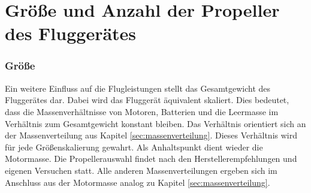 \section{Größe und Anzahl der Propeller des Fluggerätes}
\label{sec:groesse}
\subsubsection{Größe}
\label{subsubsec:groesse}
Ein weitere Einfluss auf die Flugleistungen stellt das Gesamtgewicht des Fluggerätes dar. Dabei wird das Fluggerät äquivalent skaliert. Dies bedeutet, dass die Massenverhältnisse von Motoren, Batterien und die Leermasse im Verhältnis zum Gesamtgewicht konstant bleiben. Das Verhältnis orientiert sich an der Massenverteilung aus Kapitel \ref{sec:massenverteilung}. Dieses Verhältnis wird für jede Größenskalierung gewahrt. Als Anhaltspunkt dient wieder die Motormasse. Die Propellerauswahl findet nach den Herstellerempfehlungen und eigenen Versuchen statt. Alle anderen Massenverteilungen ergeben sich im Anschluss aus der Motormasse analog zu Kapitel \ref{sec:massenverteilung}.

